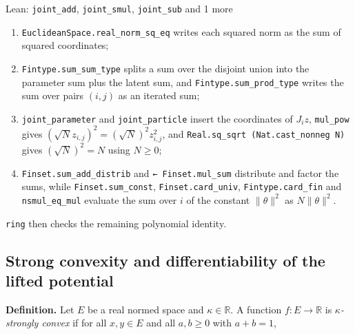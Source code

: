 \documentclass[11pt,a4paper]{report}
\begin{document}
\begin{leanbox}{Lean: \texttt{joint\_\allowbreak{}add}, \texttt{joint\_\allowbreak{}smul}, \texttt{joint\_\allowbreak{}sub} and 1 more}
\begin{enumerate}


\item \texttt{Euclidean\allowbreak{}Space.\allowbreak{}real\_\allowbreak{}norm\_\allowbreak{}sq\_\allowbreak{}eq} writes each squared norm as the sum of squared coordinates;

\item \texttt{Fintype.\allowbreak{}sum\_\allowbreak{}sum\_\allowbreak{}type} splits a sum over the disjoint union into the parameter sum plus the latent sum, and \texttt{Fintype.\allowbreak{}sum\_\allowbreak{}prod\_\allowbreak{}type} writes the sum over pairs \((i,j)\) as an iterated sum;

\item \texttt{joint\_\allowbreak{}parameter} and \texttt{joint\_\allowbreak{}particle} insert the coordinates of \(J_iz\), \texttt{mul\_\allowbreak{}pow} gives \((\sqrt Nz_{i,j})^2=(\sqrt N)^2z_{i,j}^2\), and \texttt{Real.\allowbreak{}sq\_\allowbreak{}sqrt (Nat.\allowbreak{}cast\_\allowbreak{}nonneg N)} gives \((\sqrt N)^2=N\) using \(N\ge0\);

\item \texttt{Finset.\allowbreak{}sum\_\allowbreak{}add\_\allowbreak{}distrib} and \texttt{← Finset.\allowbreak{}mul\_\allowbreak{}sum} distribute and factor the sums, while \texttt{Finset.\allowbreak{}sum\_\allowbreak{}const}, \texttt{Finset.\allowbreak{}card\_\allowbreak{}univ}, \texttt{Fintype.\allowbreak{}card\_\allowbreak{}fin} and \texttt{nsmul\_\allowbreak{}eq\_\allowbreak{}mul} evaluate the sum over \(i\) of the constant \(\|\theta\|^2\) as \(N\|\theta\|^2\).

\end{enumerate}



\texttt{ring} then checks the remaining polynomial identity.
\end{leanbox}
\subsection{\texorpdfstring{Strong convexity and differentiability of the lifted potential}{Strong convexity and differentiability of the lifted potential}}
\label{report-step-IPLA-Geometry-lean-3}


\textbf{Definition.} Let \(E\) be a real normed space and \(\kappa\in\mathbb R\). A function \(f:E\to\mathbb R\) is \emph{\(\kappa\)-strongly convex} if for all \(x,y\in E\) and all \(a,b\ge0\) with \(a+b=1\),
\end{document}
